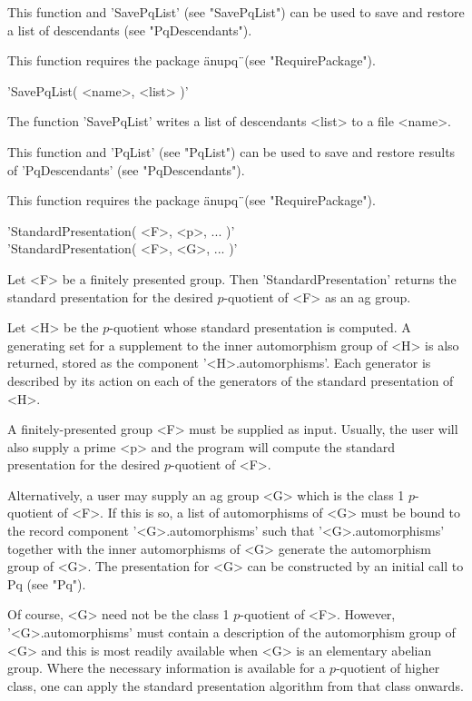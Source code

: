 This  function  and  'SavePqList'  (see  "SavePqList")  can  be  used  to
save and restore a list of descendants (see "PqDescendants").

This function requires the package \"anupq\"\ (see "RequirePackage").


'SavePqList( <name>, <list> )'

The function 'SavePqList' writes a list of  descendants  <list> to a file
<name>.

This function and 'PqList' (see "PqList") can be used to save and restore
results of 'PqDescendants' (see "PqDescendants").

This function requires the package \"anupq\"\ (see "RequirePackage").


'StandardPresentation( <F>, <p>, ...  )' \\
'StandardPresentation( <F>, <G>, ...  )'

Let  <F> be  a  finitely  presented group.   Then  'StandardPresentation'
returns the standard presentation for the  desired $p$-quotient of <F> as
an ag group.

Let <H> be the  $p$-quotient whose standard presentation is  computed.  A
generating set for a supplement to the inner automorphism group of <H> is
also  returned,   stored  as  the  component  '<H>.automorphisms'.   Each
generator is described by  its  action on  each of the generators  of the
standard presentation of <H>.

A  finitely-presented group <F> must be  supplied  as input. Usually, the
user will  also  supply a prime  <p> and  the  program will  compute  the
standard presentation for the desired $p$-quotient of <F>.

Alternatively,  a  user may supply an ag group <G> which  is the class  1
$p$-quotient of <F>. If  this is  so, a list of automorphisms of <G> must
be   bound  to   the   record  component  '<G>.automorphisms'  such  that
'<G>.automorphisms' together with the inner automorphisms of <G> generate
the  automorphism  group  of  <G>.   The  presentation  for  <G>  can  be
constructed by an initial call to Pq (see "Pq").

Of  course, <G> need  not be the class  1 $p$-quotient of <F>.   However,
'<G>.automorphisms' must contain a description of the  automorphism group
of  <G>  and this is  most readily  available when  <G> is  an elementary
abelian  group.   Where the  necessary information  is  available  for  a
$p$-quotient of higher class,  one  can  apply  the standard presentation
algorithm from that class onwards.

